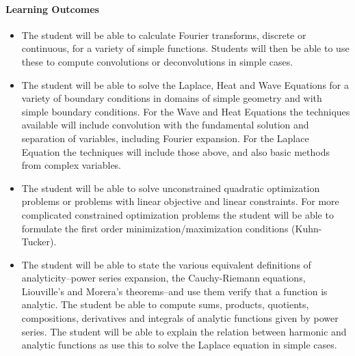 \paragraph{Learning Outcomes}
\begin{itemize}
\item The student will be able to calculate Fourier transforms,
discrete or continuous, for a variety of simple functions.
Students will then be able to use these to compute convolutions
or deconvolutions in simple cases.
\item The student will be able to solve the Laplace, Heat and
Wave Equations for a variety of boundary conditions in domains
of simple geometry and
with simple boundary conditions.  For the Wave and Heat Equations
the techniques available will include convolution with the
fundamental solution and separation of variables, including
Fourier expansion.  For the Laplace Equation the techniques will
include those above, and also basic methods from complex variables.
\item The student will be able to solve unconstrained quadratic
optimization problems or problems with linear objective and
linear constraints.  For more complicated constrained optimization
problems the student will be able to formulate the first order
minimization/maximization conditions (Kuhn-Tucker).
\item The student will be able to state the various equivalent
definitions of analyticity--power series expansion, the Cauchy-Riemann
equations, Liouville's and Morera's theorems--and use them verify that
a function is analytic.  The student be able to compute sums, products,
quotients, compositions, derivatives and integrals of analytic functions
given by power series.  The student will be able to explain the relation
between harmonic and analytic functions as use this to solve the Laplace
equation in simple cases.
\end{itemize}
